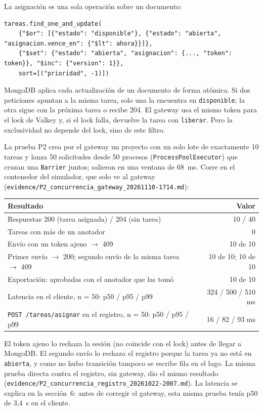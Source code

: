 \documentclass[10pt,letterpaper]{article}
\newcommand{\ev}[1]{{\footnotesize\texttt{evidence/\allowbreak #1}}}
\begin{document}
La asignación es una sola operación sobre un documento:

\begin{Verbatim}
tareas.find_one_and_update(
    {"$or": [{"estado": "disponible"}, {"estado": "abierta", "asignacion.vence_en": {"$lt": ahora}}]},
    {"$set": {"estado": "abierta", "asignacion": {..., "token": token}}, "$inc": {"version": 1}},
    sort=[("prioridad", -1)])
\end{Verbatim}

MongoDB aplica cada actualización de un documento de forma atómica. Si dos peticiones apuntan a la misma
tarea, solo una la encuentra en \texttt{disponible}; la otra sigue con la próxima tarea o recibe 204.
El gateway usa el mismo token para el lock de Valkey y, si el lock falla, devuelve la tarea con
\texttt{liberar}. Pero la exclusividad no depende del lock, sino de este filtro.

La prueba P2 crea por el gateway un proyecto con un solo lote de exactamente 10 tareas y lanza 50
solicitudes desde 50 procesos (\texttt{ProcessPoolExecutor}) que cruzan una \texttt{Barrier} juntos; salieron
en una ventana de 68~ms. Corre en el contenedor del simulador, que solo ve al gateway
(\ev{P2\_concurrencia\_gateway\_20261110-1714.md}):

\begin{center}\small
\begin{tabular}{@{}lr@{}}
\toprule
Resultado & Valor \\
\midrule
Respuestas 200 (tarea asignada) / 204 (sin tarea) & 10 / 40 \\
Tareas con más de un anotador & 0 \\
Envío con un token ajeno $\rightarrow$ 409 & 10 de 10 \\
Primer envío $\rightarrow$ 200; segundo envío de la misma tarea $\rightarrow$ 409 & 10 de 10; 10 de 10 \\
Exportación: aprobadas con el anotador que las tomó & 10 de 10 \\
Latencia en el cliente, n = 50: p50 / p95 / p99 & 324 / 500 / 510 ms \\
\texttt{POST /tareas/asignar} en el registro, n = 50: p50 / p95 / p99 & 16 / 82 / 93 ms \\
\bottomrule
\end{tabular}
\end{center}

El token ajeno lo rechaza la sesión (no coincide con el lock) antes de llegar a MongoDB. El segundo envío lo
rechaza el registro porque la tarea ya no está en \texttt{abierta}, y como no hubo transición tampoco se
escribe fila en el lago. La misma prueba directa contra el registro, sin gateway, dio el mismo resultado
(\ev{P2\_concurrencia\_registro\_20261022-2007.md}). La latencia se explica en la sección~6: antes de
corregir el gateway, esta misma prueba tenía p50 de 3,4~s en el cliente.
\end{document}
